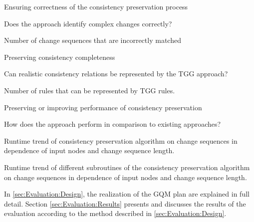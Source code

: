 \begin{gqm}
    \item Ensuring correctness of the consistency preservation process
    \begin{gqm}
        \item Does the approach identify complex changes correctly?
        \begin{gqm}
            \item Number of change sequences that are incorrectly matched
        \end{gqm}
    \end{gqm}
    \item Preserving consistency completeness
    \begin{gqm}
        \item Can realistic consistency relations be represented by the TGG approach?
        \begin{gqm}
            \item Number of rules that can be represented by TGG rules.
        \end{gqm}
    \end{gqm}
    \item Preserving or improving performance of consistency preservation
    \begin{gqm}
        \item How does the approach perform in comparison to existing approaches?
        \begin{gqm}
            \item Runtime trend of consistency preservation algorithm on change sequences in dependence of input nodes and change sequence length.
            \item Runtime trend of different subroutines of the consistency preservation algorithm on change sequences in dependence of input nodes and change sequence length.
        \end{gqm}
    \end{gqm}
\end{gqm}

In \autoref{sec:Evaluation:Design}, the realization of the GQM plan are explained in full detail.
Section \ref{sec:Evaluation:Results} presents and discusses the results of the evaluation according to the method described in \autoref{sec:Evaluation:Design}.

